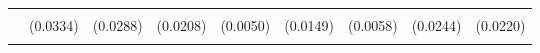 \begin{table}[!h]
\begin{tabular}[t]{lllllllll}
\addlinespace
\cellcolor{gray!10}{WSLS} & \cellcolor{gray!10}{0.0740*} & \cellcolor{gray!10}{0.0585*} & \cellcolor{gray!10}{0.0293} & \cellcolor{gray!10}{0.0000} & \cellcolor{gray!10}{0.0243} & \cellcolor{gray!10}{0.0005} & \cellcolor{gray!10}{0.0529*} & \cellcolor{gray!10}{0.0670**}\\
 & (0.0334) & (0.0288) & (0.0208) & (0.0050) & (0.0149) & (0.0058) & (0.0244) & (0.0220)\\
\cellcolor{gray!10}{T2} & \cellcolor{gray!10}{0.1460} & \cellcolor{gray!10}{0.1903**} & \cellcolor{gray!10}{0.0000} & \cellcolor{gray!10}{0.0719*} & \cellcolor{gray!10}{0.1124*} & \cellcolor{gray!10}{0.1038**} & \cellcolor{gray!10}{0.2058**} & \cellcolor{gray!10}{0.2219**}\\
\bottomrule
\end{tabular}
\end{table}